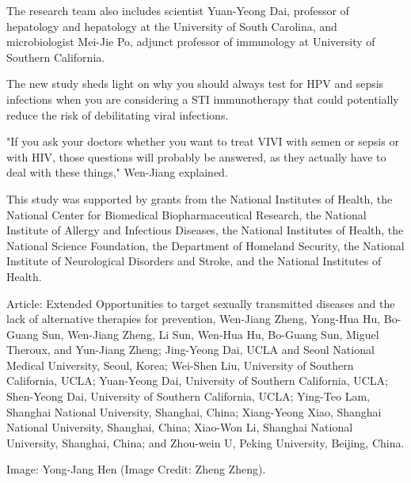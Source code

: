 \documentclass{article}
\begin{document}
The research team also includes scientist Yuan-Yeong Dai, professor of hepatology and hepatology at the University of South Carolina, and microbiologist Mei-Jie Po, adjunct professor of immunology at University of Southern California.

The new study sheds light on why you should always test for HPV and sepsis infections when you are considering a STI immunotherapy that could potentially reduce the risk of debilitating viral infections.

"If you ask your doctors whether you want to treat VIVI with semen or sepsis or with HIV, those questions will probably be answered, as they actually have to deal with these things," Wen-Jiang explained.

This study was supported by grants from the National Institutes of Health, the National Center for Biomedical Biopharmaceutical Research, the National Institute of Allergy and Infectious Diseases, the National Institutes of Health, the National Science Foundation, the Department of Homeland Security, the National Institute of Neurological Disorders and Stroke, and the National Institutes of Health.

Article: Extended Opportunities to target sexually transmitted diseases and the lack of alternative therapies for prevention, Wen-Jiang Zheng, Yong-Hua Hu, Bo-Guang Sun, Wen-Jiang Zheng, Li Sun, Wen-Hua Hu, Bo-Guang Sun, Miguel Theroux, and Yun-Jiang Zheng; Jing-Yeong Dai, UCLA and Seoul National Medical University, Seoul, Korea; Wei-Shen Liu, University of Southern California, UCLA; Yuan-Yeong Dai, University of Southern California, UCLA; Shen-Yeong Dai, University of Southern California, UCLA; Ying-Teo Lam, Shanghai National University, Shanghai, China; Xiang-Yeong Xiao, Shanghai National University, Shanghai, China; Xiao-Won Li, Shanghai National University, Shanghai, China; and Zhou-wein U, Peking University, Beijing, China.

Image: Yong-Jang Hen (Image Credit: Zheng Zheng).
\end{document}
